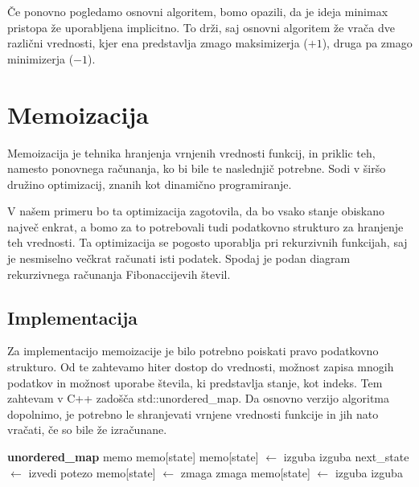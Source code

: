 \documentclass[12pt]{report}
\begin{document}
Če ponovno pogledamo osnovni algoritem, bomo opazili, da je ideja minimax pristopa že uporabljena implicitno. To drži, saj osnovni algoritem že vrača dve različni vrednosti, kjer ena predstavlja zmago maksimizerja ($+1$), druga pa zmago minimizerja ($-1$).

\section{Memoizacija}
Memoizacija je tehnika hranjenja vrnjenih vrednosti funkcij, in priklic teh, namesto ponovnega računanja, ko bi bile te naslednjič potrebne. Sodi v širšo družino optimizacij, znanih kot dinamično programiranje. 

V našem primeru bo ta optimizacija zagotovila, da bo vsako stanje obiskano največ enkrat, a bomo za to potrebovali tudi podatkovno strukturo za hranjenje teh vrednosti. Ta optimizacija se pogosto uporablja pri rekurzivnih funkcijah, saj je nesmiselno večkrat računati isti podatek. Spodaj je podan diagram rekurzivnega računanja Fibonaccijevih števil.



\subsection*{Implementacija}
Za implementacijo memoizacije je bilo potrebno poiskati pravo podatkovno strukturo. Od te zahtevamo hiter dostop do vrednosti, možnost zapisa mnogih podatkov in možnost uporabe števila, ki predstavlja stanje, kot indeks. Tem zahtevam v C++ zadošča std::unordered\_map. Da osnovno verzijo algoritma dopolnimo, je potrebno le shranjevati vrnjene vrednosti funkcije in jih nato vračati, če so bile že izračunane.

\begin{algorithm}[H]
\label{alg:memo_search}
\caption{Psevdokoda algoritma z memoizacijo}
\begin{algorithmic}[1]
\State \textbf{unordered\_map} memo
        \State \Return memo[state]
    \EndIf
        \State memo[state] $\gets$ izguba
        \State \Return izguba
    \EndIf
        \State next\_state $\gets$ izvedi potezo
            \State memo[state] $\gets$ zmaga
            \State \Return zmaga
        \EndIf
    \EndFor
    \State memo[state] $\gets$ izguba
    \State \Return izguba
\EndFunction
\end{algorithmic}
\end{algorithm}
\end{document}
